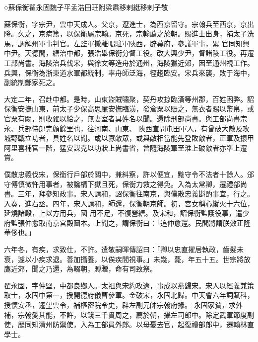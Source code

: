 
\begin{pinyinscope}

 ○蘇保衡翟永固魏子平孟浩田玨附梁肅移剌綎移剌子敬



 蘇保衡，字宗尹，雲中天成人。父京，遼進士，為西京留守。宗翰兵至西京，京出降。久之，京病篤，以保衡屬宗翰。京死，宗翰薦之於朝。賜進士出身，補太子洗馬，調解州軍事判官。左監軍撒離喝駐軍陜西，辟幕府，參議軍事，累
 官同知興中尹。天德間，繕治中都，張浩舉保衡分督工役。改大興少尹，督諸陵工役。再遷工部尚書。海陵治兵伐宋，與徐文等造舟於通州，海陵獵近郊，因至通州視工作。兵興，保衡為浙東道水軍都統制，率舟師泛海，徑趨臨安。宋兵來襲，敗于海中，副統制鄭家死之。



 大定二年，召赴中都。是時，山東盜賊嘯聚，契丹攻掠臨潢等州郡，百姓困弊。詔保衡安撫山東，前太子少保高思廉安撫臨潢，發倉粟以賑之，無衣者賜以幣帛，或官粟有闕，則收糴以給之，無妻室者具姓名以聞。還除刑部尚書。與工部尚書宗永、兵部侍郎完顏餘里也，往河南、山東、
 陜西宣問屯田軍人，有曾破大敵及攻城野戰立功者，具姓名以聞。或以寡敵眾，或與敵相當能先登敗敵者，正軍及擐甲阿里喜補官一階，猛安謀克以功狀上尚書省，曾隨海陵軍至淮上破敵者亦準上遷賞。



 僕散忠義伐宋，保衡行戶部於關中，兼糾察，許以便宜，黜守令不法者十餘人。邠守傅慎微忤用事者，被讒構下獄且死，保衡力救之得免。入為太常卿，遷禮部尚書。三年，拜參知政事。宋人請和，詔保衡往南京，與僕散忠義斟酌事宜，行之。入奏，進右丞。四年，宋人請和，師還，保衡朝京師。初，宮女稱心縱火十六位，延燒諸殿，上以方用兵，國
 用不足，不復營繕。及宋和，詔保衡監護役事，遣少府監張仲愈取南京宮殿圖本。上聞之，謂保衡曰：「追仲愈還。民間將謂朕效正隆華侈也。」



 六年冬，有疾，求致仕，不許。遣敬嗣暉傳詔曰：「卿以忠直擢居執政，齒髮未衰，遽以小疾求退。善加攝養，以俟疾間視事。」未幾，薨，年五十五。世宗將放鷹近郊，聞之乃還，為輟朝，賻贈，命有司致祭。



 翟永固，字仲堅，中都良鄉人。太祖與宋約攻遼，事成以燕歸宋。宋人以經義兼策取士，永固中第一，授開德府儀曹參軍。金破宋，永固北歸。中天會六年詞賦科，授懷安丞，遷望雲令，補樞密院令史，辟左副元帥宗翰府掾。
 永固家貧，求外補，宗翰愛其能，不許，以錢三千貫周之，薦於朝，攝左司郎中。除定武軍節度副使，歷同知清州防禦使，入為工部員外郎。以母憂去官，起復禮部郎中，遷翰林直學士。




\end{pinyinscope}
